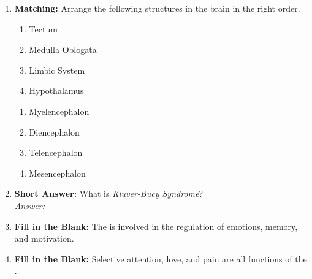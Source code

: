 \begin{enumerate}[label=\textbf{Q1.10.\arabic*}]
      \item \textbf{Matching:} Arrange the following structures in the brain in the right order.
      \begin{wordbox}
            \begin{enumerate}[label=(\roman*)]
                  \item Tectum
                  \item Medulla Oblogata
                  \item Limbic System
                  \item Hypothalamus
            \end{enumerate}
      \end{wordbox}
      \begin{enumerate}[label=(\alph*)]
            \item Myelencephalon \quad \dotfill \quad \underline{\hspace{3cm}}\\[0.5em]
            \item Diencephalon \quad \dotfill \quad \underline{\hspace{3cm}}\\[0.5em]
            \item Telencephalon \quad \dotfill \quad \underline{\hspace{3cm}}\\[0.5em]
            \item Mesencephalon \quad \dotfill \quad \underline{\hspace{3cm}}\\
      \end{enumerate}

      \item \textbf{Short Answer:} What is \textit{Kluver-Bucy Syndrome}? \\
            \textit{Answer:} %

      \item \textbf{Fill in the Blank:} The \underline{\hspace{3cm}} is involved in the regulation of emotions, memory, and motivation. \\

      \item \textbf{Fill in the Blank:} Selective attention, love, and pain are all functions of the \underline{\hspace{3cm}}. \\


\end{enumerate}
